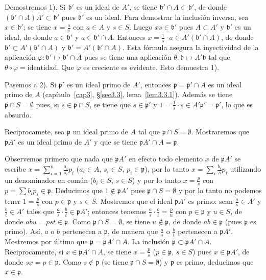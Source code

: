 \documentclass[bibtotoc,leqno,spanish]{amsbook}
\let\emph\relax %
\newcommand{\idl}[1]{\mathfrak{#1}}
\numberwithin{equation}{section}
\theoremstyle{note}
\theoremstyle{note}
\theoremstyle{rem}
\numberwithin{theorem}{section}
\numberwithin{proposition}{section}
\numberwithin{definition}{section}
\numberwithin{lemma}{section}
\numberwithin{corollary}{section}
\numberwithin{example}{section}
\numberwithin{footnote}{section}%
\begin{document}
Demostremos 1). Si $\idl{b}'$ es un ideal de $A'$, se tiene $\idl{b}'\cap A\subset\idl{b}'$, de donde
$(\idl{b}'\cap A)A'\subset\idl{b}'$ pues $\idl{b}'$ es un ideal. Para demostrar la inclusi\'on inversa, sea
$x\in\idl{b}'$; se tiene $x = \frac{a}{s}$ con $a\in A$ y $s\in S$. Luego $xs\in\idl{b}'$ pues
$A\subset A'$ y $\idl{b}'$ es un ideal, de donde $a\in\idl{b}'$ y $a\in\idl{b}'\cap A$. Entonces
$x=\frac{1}{s}\cdot a\in A'(\idl{b}'\cap A)$, de donde $\idl{b}'\subset A'(\idl{b}'\cap A)$ y
$\idl{b}'=A'(\idl{b}'\cap A)$. Esta f\'ormula asegura la inyectividad de la aplicaci\'on
$\varphi:\idl{b}'\mapsto\idl{b}'\cap A$ pues se tiene una aplicaci\'on $\theta:\idl{b}\mapsto A'\idl{b}$
tal que $\theta\circ\varphi = \text{identidad}$. Que $\varphi$ es creciente es evidente. Esto demuestra 1).

Pasemos a 2). Si $\idl{p}'$ es un ideal primo de $A'$, entonces $\idl{p} = \idl{p}'\cap A$ es un ideal primo de $A$
(cap\'itulo~\ref{cap3}, \S\ref{sec3.3}, lema~\ref{lem3.3.1}).
Adem\'as se tiene $\idl{p}\cap S=\emptyset$ pues, si
$s\in\idl{p}\cap S$, se tiene que $s\in\idl{p}'$ y $1=\frac{1}{s}\cdot s\in A'\idl{p}'=\idl{p}'$, lo que
es absurdo.

Reciprocamete, sea $\idl{p}$ un ideal primo de $A$ tal que $\idl{p}\cap S=\emptyset$. Mostraremos que
$\idl{p}A'$ es un ideal primo de $A'$ y que se tiene $\idl{p}A'\cap A = \idl{p}$.

Observemos primero que nada que $\idl{p}A'$ \emph{es el conjunto de los $\frac{p}{s}$ con
$p\in\idl{p}$ y $s\in S$:} en efecto todo elemento $x$ de $\idl{p}A'$ se escribe
$x=\sum_{i=1}^{n}\frac{a_{i}}{s_{i}}p_{i}$
($a_{i}\in A$, $s_{i}\in S$, $p_{i}\in\idl{p}$), por lo tanto $x=\sum_{i}\frac{b_{i}}{s}p_{i}$ utilizando
un denominador en com\'un ($b_{i}\in S$, $s\in S$) y por lo tanto $x = \frac{p}{s}$ con $p=\sum b_{i}p_{i}\in\idl{p}$.
Deducimos que $1\notin\idl{p}A'$ pues $\idl{p}\cap S=\emptyset$ y por lo tanto no podemos tener
$1=\frac{p}{s}$ con $p\in\idl{p}$ y $s\in S$. Mostremos que el ideal $\idl{p}A'$ es primo:
sean $\frac{a}{s}\in A'$ y $\frac{b}{t}\in A'$ tales que $\frac{a}{s}\cdot\frac{b}{t}\in\idl{p}A'$; entonces
tenemos $\frac{a}{s}\cdot\frac{b}{t} = \frac{p}{u}$ con $p\in\idl{p}$ y $u\in S$, de donde
$abu = pst\in\idl{p}$. Como $\idl{p}\cap S=\emptyset$, se tiene $u\notin\idl{p}$, de donde $ab\in\idl{p}$
(pues $\idl{p}$ es primo). As\'i, $a$ o $b$ pertenecen a $\idl{p}$, de manera que
$\frac{a}{s}$ o $\frac{b}{t}$ pertenecen a $\idl{p}A'$. Mostremos por \'ultimo que $\idl{p}=\idl{p}A'\cap A$.
La inclusi\'on $\idl{p}\subset\idl{p}A'\cap A$. Reciprocamente, si $x\in\idl{p}A'\cap A$, se tiene
$x = \frac{p}{s}$ ($p\in\idl{p}$, $s\in S$) pues $x\in\idl{p}A'$, de donde $sx = p\in\idl{p}$. Como
$s\notin\idl{p}$ (se tiene $\idl{p}\cap S = \emptyset$) y $\idl{p}$ es primo, deducimos que $x\in\idl{p}$.
\end{document}
